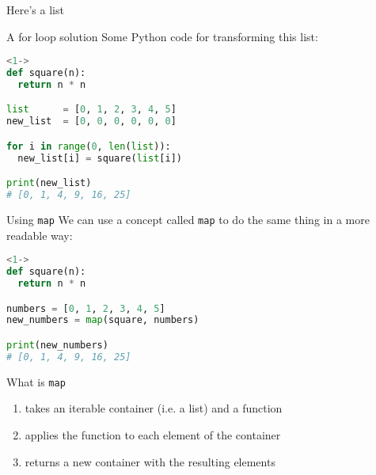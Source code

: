 \documentclass[../index.tex]{subfiles}
\begin{document}
\renewcommand{\currenttitle}{Here's a list}
\begin{frame}{\currenttitle}
  \onslide<+->{\texttt{[0, 1, 2, 3, 4, 5]}}
  \onslide<+->{$\rightarrow$ \texttt{[0, 1, 4, 9, 16, 25]}}
\end{frame}

\renewcommand{\currenttitle}{A for loop solution}
\begin{frame}[fragile]{\currenttitle}
  Some Python code for transforming this list:

  \begin{lstlisting}[language=Python]<1->
def square(n):
  return n * n

list      = [0, 1, 2, 3, 4, 5]
new_list  = [0, 0, 0, 0, 0, 0]

for i in range(0, len(list)):
  new_list[i] = square(list[i])

print(new_list)
# [0, 1, 4, 9, 16, 25]
  \end{lstlisting}

\end{frame}

\renewcommand{\currenttitle}{Using \texttt{map}}
\begin{frame}[fragile]{\currenttitle}
  We can use a concept called \texttt{map} to do the same thing in a more
  readable way: \\[1em]

  \begin{lstlisting}[language=Python]<1->
def square(n):
  return n * n

numbers = [0, 1, 2, 3, 4, 5]
new_numbers = map(square, numbers)

print(new_numbers)
# [0, 1, 4, 9, 16, 25]
  \end{lstlisting}

\end{frame}

\renewcommand{\currenttitle}{What is \texttt{map}}
\begin{frame}[fragile]{\currenttitle}

  \begin{enumerate}
    \item<+-> takes an iterable container (i.e. a list) and a function
    \item<+-> applies the function to each element of the container
    \item<+-> returns a new container with the resulting elements
  \end{enumerate}
\end{frame}
\end{document}
